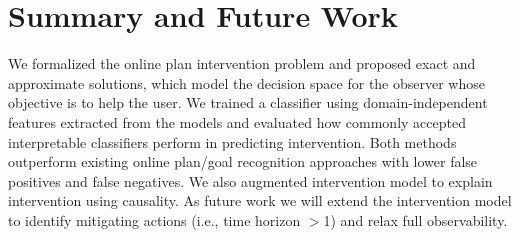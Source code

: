 \section{Summary and Future Work}

We formalized the online plan intervention problem and proposed exact and approximate solutions, which model the decision space for the observer whose objective is to help the user. We trained a classifier using domain-independent features extracted from the models and evaluated how commonly accepted interpretable classifiers perform in predicting intervention. Both methods outperform existing online plan/goal recognition approaches with lower false positives and false negatives. We also augmented intervention model to explain intervention using causality. As future work we will extend the intervention model to identify mitigating actions (i.e., time horizon $>$1) and relax full observability. %